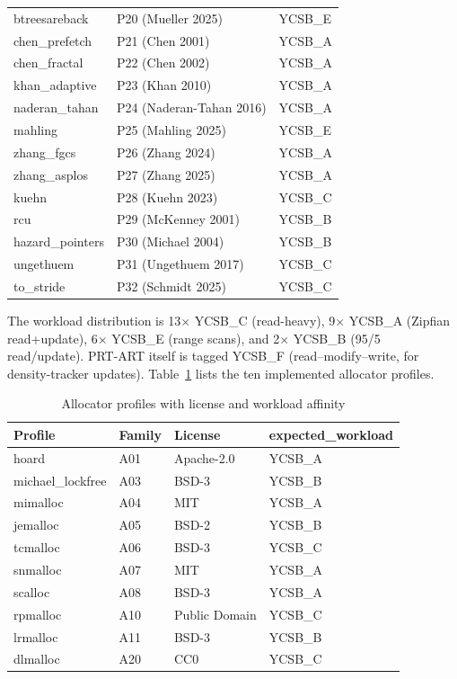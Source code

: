 \begin{table}[!htbp]
\begin{tabular}{lll}
btreesareback & P20 (Mueller 2025) & YCSB\_E \\
chen\_prefetch & P21 (Chen 2001) & YCSB\_A \\
chen\_fractal & P22 (Chen 2002) & YCSB\_A \\
khan\_adaptive & P23 (Khan 2010) & YCSB\_A \\
naderan\_tahan & P24 (Naderan-Tahan 2016) & YCSB\_A \\
mahling & P25 (Mahling 2025) & YCSB\_E \\
zhang\_fgcs & P26 (Zhang 2024) & YCSB\_A \\
zhang\_asplos & P27 (Zhang 2025) & YCSB\_A \\
kuehn & P28 (Kuehn 2023) & YCSB\_C \\
rcu & P29 (McKenney 2001) & YCSB\_B \\
hazard\_pointers & P30 (Michael 2004) & YCSB\_B \\
ungethuem & P31 (Ungethuem 2017) & YCSB\_C \\
to\_stride & P32 (Schmidt 2025) & YCSB\_C \\
\bottomrule
\end{tabular}
\end{table}

The workload distribution is 13$\times$ YCSB\_C (read-heavy), 9$\times$ YCSB\_A (Zipfian
read+update), 6$\times$ YCSB\_E (range scans), and 2$\times$ YCSB\_B (95/5 read/update).
PRT-ART itself is tagged YCSB\_F (read--modify--write, for density-tracker updates).
Table~\ref{tab:allocator-profiles} lists the ten implemented allocator profiles.

\begin{table}[!htbp]
\caption{Allocator profiles with license and workload affinity}\label{tab:allocator-profiles}
\centering\small
\begin{tabular}{llll}
\toprule
\textbf{Profile} & \textbf{Family} & \textbf{License} & \textbf{expected\_workload} \\
\midrule
hoard & A01 & Apache-2.0 & YCSB\_A \\
michael\_lockfree & A03 & BSD-3 & YCSB\_B \\
mimalloc & A04 & MIT & YCSB\_A \\
jemalloc & A05 & BSD-2 & YCSB\_B \\
tcmalloc & A06 & BSD-3 & YCSB\_C \\
snmalloc & A07 & MIT & YCSB\_A \\
scalloc & A08 & BSD-3 & YCSB\_A \\
rpmalloc & A10 & Public Domain & YCSB\_C \\
lrmalloc & A11 & BSD-3 & YCSB\_B \\
dlmalloc & A20 & CC0 & YCSB\_C \\
\bottomrule
\end{tabular}
\end{table}

